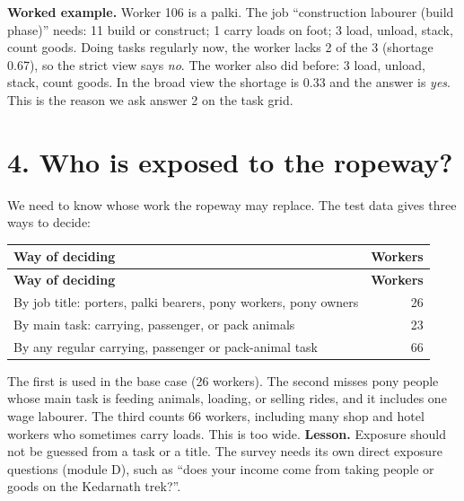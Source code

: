 \documentclass[11pt]{article}
\begin{document}
\textbf{Worked example.} Worker 106 is a palki. The job ``construction labourer (build phase)'' needs: 11 build or construct; 1 carry loads on foot; 3 load, unload, stack, count goods.
Doing tasks regularly now, the worker lacks 2 of the 3 (shortage 0.67), so the strict view says \emph{no}.
The worker also did before: 3 load, unload, stack, count goods. In the broad view the shortage is 0.33 and the answer is \emph{yes}.
This is the reason we ask answer 2 on the task grid.

\section*{4. Who is exposed to the ropeway?}
We need to know whose work the ropeway may replace. The test data gives three ways to decide:
{\small
\begin{longtable}{p{11cm}r}
\toprule
\textbf{Way of deciding} & \textbf{Workers} \\
\midrule
\endfirsthead
\toprule
\textbf{Way of deciding} & \textbf{Workers} \\
\midrule
\endhead
By job title: porters, palki bearers, pony workers, pony owners & 26 \\
By main task: carrying, passenger, or pack animals & 23 \\
By any regular carrying, passenger or pack-animal task & 66 \\
\bottomrule
\end{longtable}
}

The first is used in the base case (26 workers). The second misses pony people whose main task is feeding animals, loading, or selling rides, and it includes one wage labourer.
The third counts 66 workers, including many shop and hotel workers who sometimes carry loads. This is too wide.
\textbf{Lesson.} Exposure should not be guessed from a task or a title. The survey needs its own direct exposure questions (module D), such as ``does your income come from taking people or goods on the Kedarnath trek?''.
\end{document}
